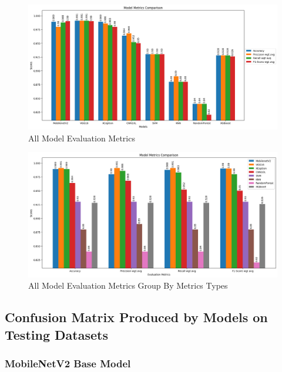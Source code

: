 \begin{figure}
    \centering
    \includegraphics[width=1\linewidth]{graphics//chapter6/all model evaluation.png}
    \caption{All Model Evaluation Metrics}
    \label{fig:all-eval0}
\end{figure}


\begin{figure}
    \centering
    \includegraphics[width=1\linewidth]{graphics//chapter6/model eval grp by metric.png}
    \caption{All Model Evaluation Metrics Group By Metrics Types}
    \label{fig:all-eval1}
\end{figure}


\subsection{Confusion Matrix Produced by Models on Testing Datasets}

\subsubsection{MobileNetV2 Base Model}

